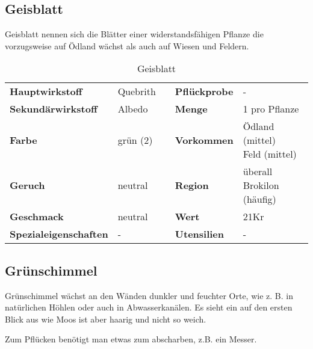 \subsection{Geisblatt}
Geisblatt nennen sich die Blätter einer widerstandsfähigen Pflanze die vorzugsweise auf Ödland wächst als auch auf Wiesen und Feldern. 

\begin{table}[h] 
\begin{center} 
\begin{tabular}{|l|l|p{1cm}|l|l|} 
  	\cline{1-2} \cline{4-5} 
  	\textbf{Hauptwirkstoff} & Quebrith && \textbf{Pflückprobe} & - \\ \cline{1-2} \cline{4-5} 
  	\textbf{Sekundärwirkstoff} & Albedo && \textbf{Menge} & 1 pro Pflanze \\ \cline{1-2} \cline{4-5} 
  	\textbf{Farbe} & grün (2) && \textbf{Vorkommen} & \brcell{Ödland (mittel) \\ Feld (mittel)} \\ \cline{1-2} \cline{4-5} 
  	\textbf{Geruch} & neutral && \textbf{Region} & \brcell{überall \\ Brokilon (häufig)} \\ \cline{1-2} \cline{4-5} 
  	\textbf{Geschmack} & neutral && \textbf{Wert} & 21Kr \\ \cline{1-2} \cline{4-5} 
  	\textbf{Spezialeigenschaften} & - && \textbf{Utensilien} & - \\ \cline{1-2} \cline{4-5} 
\end{tabular} 
\end{center} 
\caption{Geisblatt} 
\label{tab:geisblatt} 
\end{table}


\subsection{Grünschimmel}
Grünschimmel wächst an den Wänden dunkler und feuchter Orte, wie z. B. in natürlichen Höhlen oder auch in Abwasserkanälen. Es sieht ein auf den ersten Blick aus wie Moos ist aber haarig und nicht so weich.

Zum Pflücken benötigt man etwas zum abscharben, z.B. ein Messer.

